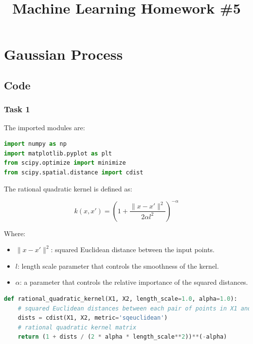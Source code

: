 \documentclass{homework}
\begin{document}
\title{Machine Learning Homework \#5}
\author{\chineseName \masterStudentID}
\date{}
\maketitle

\section{Gaussian Process}

\subsection{Code}

\subsubsection{Task 1}

The imported modules are:

\begin{lstlisting}[language=Python]
import numpy as np
import matplotlib.pyplot as plt
from scipy.optimize import minimize
from scipy.spatial.distance import cdist
\end{lstlisting}


The rational quadratic kernel is defined as:

\[
k(x, x') = \left(1 + \frac{\|x - x'\|^2}{2\alpha l^2}\right)^{-\alpha}
\]

Where:

\begin{itemize}
    \item \( \|x - x'\|^2 \): squared Euclidean distance between the input points.
    \item \( l \): length scale parameter that controls the smoothness of the kernel.
    \item \( \alpha \): a parameter that controls the relative importance of the squared distances.
\end{itemize}

\begin{lstlisting}[language=Python]
def rational_quadratic_kernel(X1, X2, length_scale=1.0, alpha=1.0):
    # squared Euclidean distances between each pair of points in X1 and X2
    dists = cdist(X1, X2, metric='sqeuclidean')
    # rational quadratic kernel matrix
    return (1 + dists / (2 * alpha * length_scale**2))**(-alpha)
\end{lstlisting}
\end{document}

